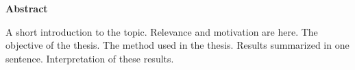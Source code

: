 \begin{center}
    \Large
    \textbf{\myTitel}

    \vspace{0.4cm}
    \large
    \myAutor

    \vspace{0.9cm}
    \textbf{Abstract}
\end{center}
A short introduction to the topic.
Relevance and motivation are here.
The objective of the thesis.
The method used in the thesis.
Results summarized in one sentence.
Interpretation of these results.
\newpage